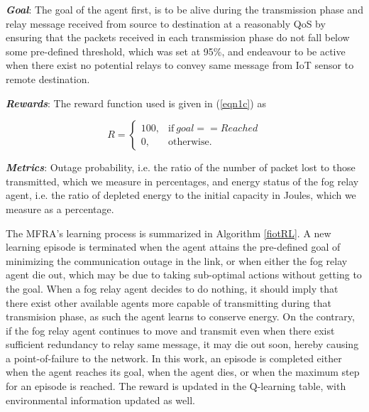 \documentclass[journal]{IEEEtran}
\begin{document}
\emph{\textbf{Goal}}: The goal of the agent first, is to be alive during the transmission phase and relay message received from source to destination at a reasonably QoS by ensuring that the packets received in each transmission phase do not fall below some pre-defined threshold, which was set at 95\%, and endeavour to be active when there exist no potential relays to convey same message from IoT sensor to remote destination.

\emph{\textbf{Rewards}}: The reward function used is given in (\ref{eqn1c}) as

 \begin{equation}\label{eqn1c}
    R =
    \begin{cases}
      100, & \text{if}\ goal==Reached \\
      0, & \text{otherwise.}
    \end{cases}
  \end{equation}


\emph{\textbf{Metrics}}: Outage probability, i.e. the ratio of the number of packet lost to those transmitted, which we measure in percentages, and energy status of the fog relay agent, i.e. the ratio of depleted energy to the initial capacity in Joules, which we measure as a percentage.

The MFRA's learning process is summarized in Algorithm \ref{fiotRL}. A new learning episode is terminated when the agent attains the pre-defined goal of minimizing the communication outage in the link, or when either the fog relay agent die out, which may be due to taking sub-optimal actions without getting to the goal. When a fog relay agent decides to do nothing, it should imply that there exist other available agents more capable of transmitting during that transmision phase, as such the agent learns to conserve energy. On the contrary, if the fog relay agent continues to move and transmit even when there exist sufficient redundancy to relay same message, it may die out soon, hereby causing a point-of-failure to the network. In this work, an episode is completed either when the agent reaches its goal, when the agent dies, or when the maximum step for an episode is reached. The reward is updated in the Q-learning table, with environmental information updated as well.
\end{document}
